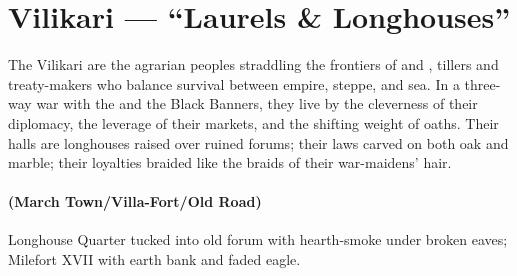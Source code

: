 \section{Vilikari --- ``Laurels \& Longhouses''}
\label{chap:vilikari}

\begin{tcolorbox}[colback=black!3,colframe=black!40!white,title={Theme \& Atmosphere}]
The Vilikari are the agrarian peoples straddling the frontiers of  and , tillers and treaty-makers who balance survival between empire, steppe, and sea. In a three-way war with the  and the Black Banners, they live by the cleverness of their diplomacy, the leverage of their markets, and the shifting weight of oaths. Their halls are longhouses raised over ruined forums; their laws carved on both oak and marble; their loyalties braided like the braids of their war-maidens' hair.
\end{tcolorbox}

\paragraph*{(March Town/Villa-Fort/Old Road)} Longhouse Quarter tucked into old forum with hearth-smoke under broken eaves; Milefort XVII with earth bank and faded eagle.

